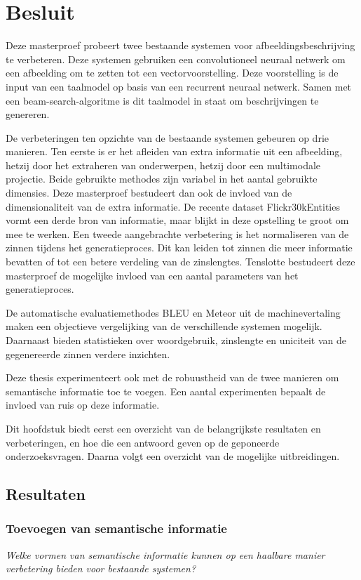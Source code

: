 \chapter{Besluit}
\label{besluit}
Deze masterproef probeert twee bestaande systemen voor afbeeldingsbeschrijving te verbeteren. Deze systemen gebruiken een convolutioneel neuraal netwerk om een afbeelding om te zetten tot een vectorvoorstelling. Deze voorstelling is de input van een taalmodel op basis van een recurrent neuraal netwerk. Samen met een beam-search-algoritme is dit taalmodel in staat om beschrijvingen te genereren.

De verbeteringen ten opzichte van de bestaande systemen gebeuren op drie manieren. Ten eerste is er het afleiden van extra informatie uit een afbeelding, hetzij door het extraheren van onderwerpen, hetzij door een multimodale projectie. Beide gebruikte methodes zijn variabel in het aantal gebruikte dimensies. Deze masterproef bestudeert dan ook de invloed van de dimensionaliteit van de extra informatie. 
De recente dataset Flickr30kEntities vormt een derde bron van informatie, maar blijkt in deze opstelling te groot om mee te werken.
Een tweede aangebrachte verbetering is het normaliseren van de zinnen tijdens het generatieproces. Dit kan leiden tot zinnen die meer informatie bevatten of tot een betere verdeling van de zinslengtes. Tenslotte bestudeert deze masterproef de mogelijke invloed van een aantal parameters van het generatieproces.

De automatische evaluatiemethodes BLEU en Meteor uit de machinevertaling maken een objectieve vergelijking van de verschillende systemen mogelijk. Daarnaast bieden statistieken over woordgebruik, zinslengte en uniciteit van de gegenereerde zinnen verdere inzichten.

Deze thesis experimenteert ook met de robuustheid van de twee manieren om semantische informatie toe te voegen. Een aantal experimenten bepaalt de invloed van ruis op deze informatie.

Dit hoofdstuk biedt eerst een overzicht van de belangrijkste resultaten en verbeteringen, en hoe die een antwoord geven op de geponeerde onderzoeksvragen. Daarna volgt een overzicht van de mogelijke uitbreidingen.
\section{Resultaten}
\subsection{Toevoegen van semantische informatie}
\emph{Welke vormen van semantische informatie kunnen op een haalbare manier verbetering bieden voor bestaande systemen?}

